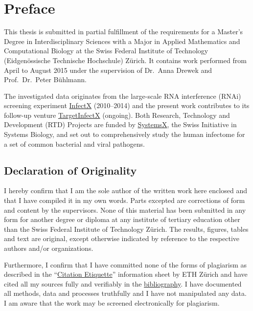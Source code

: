 \chapter{Preface}

This thesis is submitted in partial fulfillment of the requirements for a Master's Degree in Interdisciplinary Sciences with a Major in Applied Mathematics and Computational Biology at the Swiss Federal Institute of Technology (Eidgenössische Technische Hochschule) Z\"urich. It contains work performed from April to August 2015 under the supervision of Dr.\ Anna Drewek and Prof.\ Dr.\ Peter B\"uhlmann.

The investigated data originates from the large-scale RNA interference (RNAi) screening experiment \href{http://www.infectx.ch}{InfectX} (2010--2014) and the present work contributes to its follow-up venture \href{http://www.targetinfectx.ch}{TargetInfectX} (ongoing). Both Research, Technology and Development (RTD) Projects are funded by \href{http://www.systemsx.ch}{SystemsX}, the Swiss Initiative in Systems Biology, and set out to comprehensively study the human infectome for a set of common bacterial and viral pathogens.

\section*{Declaration of Originality}

I hereby confirm that I am the sole author of the written work here enclosed and that I have compiled it in my own words. Parts excepted are corrections of form and content by the supervisors. None of this material has been submitted in any form for another degree or diploma at any institute of tertiary education other than the Swiss Federal Institute of Technology Z\"urich. The results, figures, tables and text are original, except otherwise indicated by reference to the respective authors and/or organizations.

Furthermore, I confirm that I have committed none of the forms of plagiarism as described in the ``\href{https://www.ethz.ch/content/dam/ethz/main/education/rechtliches-abschluesse/leistungskontrollen/plagiarism-citationetiquette.pdf}{Citation Etiquette}'' information sheet by ETH Z\"urich and have cited all my sources fully and verifiably in the \hyperref[ch:bibliography]{bibliography}. I have documented all methods, data and processes truthfully and I have not manipulated any data. I am aware that the work may be screened electronically for plagiarism.

